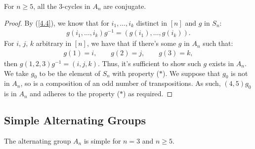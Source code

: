 For $n \geq 5$, all the 3-cycles in $A_n$ are conjugate.

\begin{proof}
    By (\ref{4.4}), we know that for $i_1, \ldots, i_k$
    distinct in $[n]$ and $g$ in $S_n$: \begin{align*}
        g(i_1, \ldots, i_k)g^{-1} 
        = (g(i_1), \ldots, g(i_k)).
    \end{align*} For $i$, $j$, $k$ arbitrary in
    $[n]$, we have that if there's some $g$ in
    $A_n$ such that: \begin{align*}
        g(1) = i, 
        \qquad g(2) = j, 
        \qquad g(3) = k, \tag{$\ast$}
    \end{align*} then $g(1, 2, 3)g^{-1} = (i, j, k)$.
    Thus, it's sufficient to show such $g$ exists in $A_n$.
    We take $g_0$ to be the element of $S_n$ with property
    ($\ast$). We suppose that $g_0$ is not in $A_n$,
    so is a composition of an odd number of transpositions.
    As such, $(4, 5)g_0$ is in $A_n$ and adheres to the
    property ($\ast$) as required.
\end{proof}

\subsection{Simple Alternating Groups} \label{7.9}

The alternating group $A_n$ is simple for $n = 3$ and $n \geq 5$.

